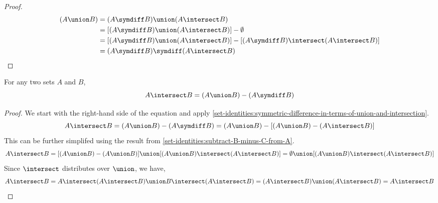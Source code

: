 \begin{proof}
\begin{align*}
        \mleft( A \union B \mright)
        &= \mleft( A \symdiff B \mright) \union \mleft( A \intersect B \mright)\\
        &= \mleft[ \mleft( A \symdiff B \mright) \union \mleft( A \intersect B \mright) \mright] - \emptyset\\
        &= \mleft[ \mleft( A \symdiff B \mright) \union \mleft( A \intersect B \mright) \mright] -
        \mleft[ \mleft( A \symdiff B \mright) \intersect \mleft( A \intersect B \mright) \mright]\\
        &= \mleft( A \symdiff B \mright) \symdiff \mleft( A \intersect B \mright) \qedhere
    \end{align*}
\end{proof}

\begin{thm}
    \label{set-identities:intersection-in-terms-of-union-and-symmetric-difference}
    For any two sets \( A \) and \( B \),
    \begin{equation*}
        A \intersect B = \mleft( A \union B \mright) - \mleft( A \symdiff B \mright)
    \end{equation*}
\end{thm}

\begin{proof}
    We start with the right-hand side of the equation and apply \cref{set-identities:symmetric-difference-in-terms-of-union-and-intersection}.
    \begin{equation*}
        A \intersect B
        = \mleft( A \union B \mright) - \mleft( A \symdiff B \mright)
        = \mleft( A \union B \mright) - \mleft[ \mleft( A \union B \mright) - \mleft( A \intersect B \mright) \mright]
    \end{equation*}
    This can be further simplifed using the result from \cref{set-identities:subtract-B-minus-C-from-A}.
    \begin{equation*}
        A \intersect B = \mleft[ \mleft( A \union B \mright) - \mleft( A \union B \mright) \mright] \union
        \mleft[ \mleft( A \union B \mright) \intersect \mleft( A \intersect B \mright) \mright]
        = \emptyset \union \mleft[ \mleft( A \union B \mright) \intersect \mleft( A \intersect B \mright) \mright]
    \end{equation*}
    Since \( \intersect \) distributes over \( \union \), we have,
    \begin{equation*}
        A \intersect B = A \intersect \mleft( A \intersect B \mright) \union B \intersect \mleft( A \intersect B \mright)
        = \mleft( A \intersect B \mright) \union \mleft( A \intersect B \mright)
        = A \intersect B \qedhere
    \end{equation*}
\end{proof}
